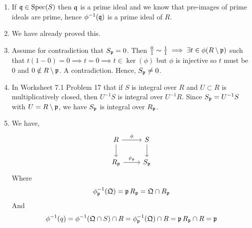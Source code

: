 \documentclass[Notebook.tex]{subfiles}
\begin{document}
\begin{solution}
    \bbni
    \begin{enumerate}
        \item If $\operatorname{\mathfrak{q}} \in \operatorname{Spec}(S)$ then $\operatorname{\mathfrak{q}}$ is a prime ideal and we know that pre-images of prime ideals are prime, hence $\phi^{-1}(\operatorname{\mathfrak{q}})$ is a prime ideal of $R$. 
        \item We have already proved this. 
        \item Assume for contradiction that $S_{\operatorname{\mathfrak{p}}} = 0$. Then $\frac{0}{1} \sim \frac{1}{1} \implies \exists t \in \phi(R \setminus \operatorname{\mathfrak{p}})$ such that $t(1 - 0) = 0 \implies t = 0 \implies t \in \ker(\phi)$ but $\phi$ is injective so $t$ must be $0$ and $0 \notin R \setminus \operatorname{\mathfrak{p}}$. A contradiction. Hence, $S_{\operatorname{\mathfrak{p}}} \neq 0$. 
        \item In Worksheet 7.1 Problem 17 that if $S$ is integral over $R$ and $U\subset R$ is multiplicatively closed, then $U^{-1}S$ is integral over $U^{-1}R$. Since $S_{\operatorname{\mathfrak{p}}} = U^{-1}S$ with $U = R \setminus \operatorname{\mathfrak{p}}$, we have $S_{\operatorname{\mathfrak{p}}}$ is integral over $R_{\operatorname{\mathfrak{p}}}$. 
        \item We have, 
         \[ \begin{tikzcd} R \arrow[r, "\phi"] \arrow[d] & S \arrow[d] \\ R_\mathfrak{p} \arrow[r, "\phi_\mathfrak{p}"] & S_\mathfrak{p} \end{tikzcd}\]
         Where
        \[\phi^{-1}_{\operatorname{\mathfrak{p}}}(\mathfrak{Q}) = \operatorname{\mathfrak{p}} R_{\operatorname{\mathfrak{p}}} = \mathfrak{Q} \cap R_{\operatorname{\mathfrak{p}}}\]
        And 
        \[\phi^{-1}({q}) = \phi^{-1}(\mathfrak{Q} \cap S) \cap R = \phi^{-1}_{\operatorname{\mathfrak{p}}} (\mathfrak{Q}) \cap R = \operatorname{\mathfrak{p}} R_{\operatorname{\mathfrak{p}}} \cap R = \operatorname{\mathfrak{p}} \]
    \end{enumerate}
\end{solution}

\newpage 
\end{document}
